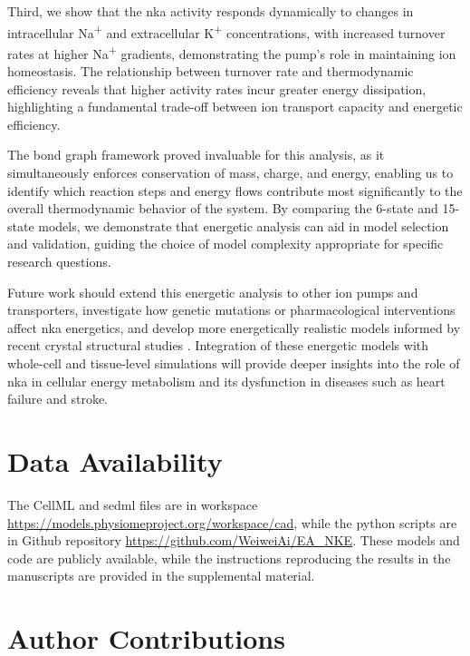 \documentclass{biophys-new}
\newcommand{\rev}[1]{{\color{black} #1}}
\begin{document}
Third, we show that the \gls{nka} activity responds dynamically to changes in intracellular Na\textsuperscript{+} and extracellular K\textsuperscript{+} concentrations, with increased turnover rates at higher Na\textsuperscript{+} gradients, demonstrating the pump's role in maintaining ion homeostasis. The relationship between turnover rate and thermodynamic efficiency reveals that higher activity rates incur greater energy dissipation, highlighting a fundamental trade-off between ion transport capacity and energetic efficiency.

The bond graph framework proved invaluable for this analysis, as it simultaneously enforces conservation of mass, charge, and energy, enabling us to identify which reaction steps and energy flows contribute most significantly to the overall thermodynamic behavior of the system. By comparing the 6-state and 15-state models, we demonstrate that energetic analysis can aid in model selection and validation, guiding the choice of model complexity appropriate for specific research questions.

Future work should extend this energetic analysis to other ion pumps and transporters, investigate how genetic mutations or pharmacological interventions affect \gls{nka} energetics, and develop more energetically realistic models informed by recent crystal structural studies \cite{kanai_binding_2021,nguyen_structural_2022,morth_crystal_2007,shinoda_crystal_2009,guo_cryo-em_2022,nyblom_crystal_2013,kanai_crystal_2013}. Integration of these energetic models with whole-cell and tissue-level simulations will provide deeper insights into the role of \gls{nka} in cellular energy metabolism and its dysfunction in diseases such as heart failure and stroke.

\section*{Data Availability}
\rev{The CellML and sedml files are in workspace \url{https://models.physiomeproject.org/workspace/cad}, while the python scripts are in Github repository \url{https://github.com/WeiweiAi/EA_NKE}. These models and code are publicly available, while the instructions reproducing the results in the manuscripts are provided in the supplemental material.}

\section*{Author Contributions}
\end{document}
